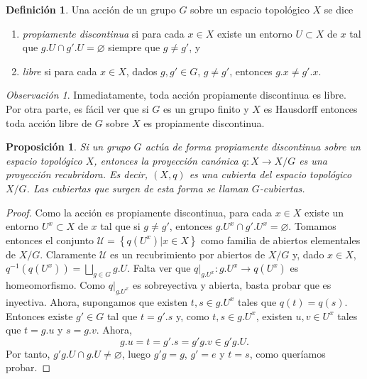 \documentclass[12pt,a4paper]{book}
\newtheorem{prop}[thm]{Proposición}
\theoremstyle{definition} \newtheorem{defn}[thm]{Definición}
\theoremstyle{definition} \newtheorem{ejemplo}[thm]{Ejemplo}
\theoremstyle{definition} \newtheorem{ejercicio}[thm]{Ejercicio}
\theoremstyle{remark} \newtheorem*{obs}{Observación}
\begin{document}
\begin{defn}
  Una acción de un grupo $G$ sobre un espacio topológico $X$ se dice 
  \begin{enumerate}
    \item \emph{propiamente discontinua} si para cada $x\in X$ existe un entorno $U\subset X$ de $x$ tal que $g.U\cap g'.U=\varnothing$ siempre que $g\neq g'$, y
    \item \emph{libre} si para cada $x \in X$, dados $g,g'\in G$, $g\neq g'$, entonces $g.x\neq g'.x$.
  \end{enumerate}
\end{defn}

\begin{obs}
  Inmediatamente, toda acción propiamente discontinua es libre. Por otra parte, es fácil ver que si $G$ es un grupo finito y $X$ es Hausdorff entonces toda acción libre de $G$ sobre $X$ es propiamente discontinua.
\end{obs}
\begin{prop}
  Si un grupo $G$ actúa de forma propiamente discontinua sobre un espacio topológico $X$, entonces la proyección canónica $q:X\rightarrow X/G$ es una proyección recubridora. Es decir, $(X,q)$ es una cubierta del espacio topológico $X/G$. Las cubiertas que surgen de esta forma se llaman \emph{$G$-cubiertas}.
\end{prop}
\begin{proof}
  Como la acción es propiamente discontinua, para cada $x\in X$ existe un entorno $U^x\subset X$ de $x$ tal que si $g\neq g'$, entonces $g.U^x\cap g'.U^x =\varnothing$. Tomamos entonces el conjunto $\mathcal{U}=\left\{q(U^x)|x\in X \right\}$ como familia de abiertos elementales de $X/G$. Claramente $\mathcal{U}$ es un recubrimiento por abiertos de $X/G$ y, dado $x\in X$, $q^{-1}(q(U^x))=\bigsqcup_{g\in G}g.U$. Falta ver que $q|_{g.U^x}:g.U^x\rightarrow q(U^x)$ es homeomorfismo. Como $q|_{g.U^x}$ es sobreyectiva y abierta, basta probar que es inyectiva. Ahora, supongamos que existen $t,s\in g.U^x$ tales que $q(t)=q(s)$. Entonces existe $g'\in G$ tal que $t= g'.s$ y, como $t,s\in g.U^x$, existen $u,v\in U^x$ tales que $t=g.u$ y $s=g.v$. Ahora,
  \begin{equation*}
    g.u=t=g'.s=g'g.v\in g'g.U.
  \end{equation*}
  Por tanto, $g'g.U\cap g.U\neq \varnothing$, luego $g'g=g$, $g'=e$ y $t=s$, como queríamos probar.
\end{proof}
\end{document}
